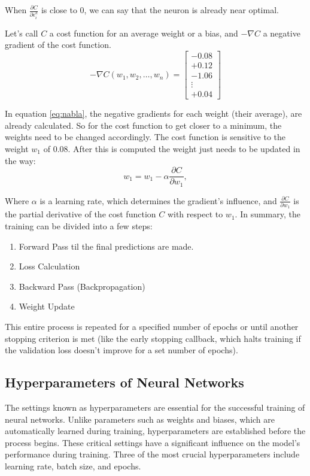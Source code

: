 When $\frac{\partial C}{\partial \epsilon_i^k}$ is close to 0, we can say that the neuron is already near optimal.

Let's call $C$ a cost function for an average weight or a bias, and $-\nabla C$ a negative gradient of the cost function. 
\begin{equation}
	-\nabla C(w_1, w_2, \dots, w_{n}) = 
	\begin{bmatrix}
		-0.08 \\
		+0.12 \\
		-1.06 \\
		\vdots \\
		+0.04
	\end{bmatrix}
	\label{eq:nabla}
\end{equation}

In equation \ref{eq:nabla}, the negative gradients for each weight (their average), are already calculated. So for the cost function to get closer to a minimum, the weights need to be changed accordingly. The cost function is sensitive to the weight $w_1$ of $0.08$. 
After this is computed the weight just needs to be updated in the way:
\begin{equation*}
	w_1= w_1 -\alpha \frac{\partial C}{\partial w_1} ,
\end{equation*}

Where $\alpha$ is a learning rate, which determines the gradient’s influence, and $\frac{\partial C}{\partial w_1} $ is the partial derivative of the cost function $C$ with respect to $w_1$.\newline
In summary, the training can be divided into a few steps:
\begin{enumerate}[label=\arabic*.]
	\item Forward Pass til the final predictions are made.
	\item Loss Calculation
	\item Backward Pass (Backpropagation)
	\item Weight Update
\end{enumerate}
This entire process is repeated for a specified number of epochs or until another stopping criterion is met (like the early stopping callback, which halts training if the validation loss doesn't improve for a set number of epochs).


\subsection{Hyperparameters of Neural Networks}
The settings known as hyperparameters are essential for the successful training of neural networks. Unlike parameters such as weights and biases, which are automatically learned during training, hyperparameters are established before the process begins. These critical settings have a significant influence on the model's performance during training.  Three of the most crucial hyperparameters include learning rate, batch size, and epochs. 


